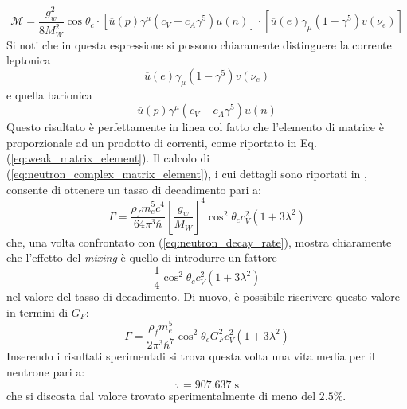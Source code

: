 \documentclass{subnucbo}
\begin{document}
\begin{equation}
        \mathcal { M } = \frac { g _ { w } ^ { 2 } } { 8 M _ { W } ^ { 2 } } \cos\theta_{c} \cdot \left[ \overline { u } ( p ) \gamma ^ { \mu } \left( c _ { V } - c _ { A } \gamma ^ { 5 } \right) u ( n ) \right] \cdot \left[ \overline { u } ( e ) \gamma _ { \mu } \left( 1 - \gamma ^ { 5 } \right) v \left( \nu _ { e } \right) \right]
        \label{eq:neutron_complex_matrix_element}
\end{equation}
Si noti che in questa espressione si possono chiaramente distinguere la corrente leptonica
\begin{equation}
        \overline { u } ( e ) \gamma _ { \mu } \left( 1 - \gamma ^ { 5 } \right) v \left( \nu _ { e } \right)
        \label{eq:leptonic_current}
\end{equation}
e quella barionica
\begin{equation}
        \overline { u } ( p ) \gamma ^ { \mu } \left( c _ { V } - c _ { A } \gamma ^ { 5 } \right) u ( n )
        \label{eq:barionic_current}
\end{equation}
Questo risultato è perfettamente in linea col fatto che l'elemento di matrice è proporzionale ad un prodotto di correnti, come riportato in Eq. (\ref{eq:weak_matrix_element}).
Il calcolo di (\ref{eq:neutron_complex_matrix_element}), i cui dettagli sono riportati in \cite{ref:hayes}, consente di ottenere un tasso di decadimento pari a:
\begin{equation}
        \Gamma = \frac { \rho_{f} m _ { e } ^ { 5 } c ^ { 4 } } { 64 \pi ^ { 3 } \hbar } \left[ \frac { g _ { w } } { M _ { W } } \right] ^ { 4 } \cos^{2}\theta_{c} c _ { V } ^ { 2 } \left( 1 + 3 \lambda ^ { 2 } \right)
\end{equation}
che, una volta confrontato con (\ref{eq:neutron_decay_rate}), mostra chiaramente che l'effetto del \textit{mixing} è quello di introdurre un fattore
\begin{equation}
        \frac { 1 } { 4 } \cos^{2}\theta_{c} c _ { V } ^ { 2 } \left( 1 + 3 \lambda ^ { 2 } \right)
\end{equation}
nel valore del tasso di decadimento. Di nuovo, è possibile riscrivere questo valore in termini di $G_{F}$:
\begin{equation}
        \Gamma = \frac { \rho_{f} m _ { e } ^ { 5 } } { 2 \pi ^ { 3 } \hbar ^ { 7 } } \cos^{2}\theta_{c} G _ { F } ^ { 2 } c_{V}^{2} \left( 1 + 3 \lambda ^ { 2 } \right)
\end{equation}
Inserendo i risultati sperimentali si trova questa volta una vita media per il neutrone pari a:
\begin{equation}
        \tau = 907.637\; \mathrm{s}
\end{equation}
che si discosta dal valore trovato sperimentalmente di meno del $2.5\%$.
\end{document}
